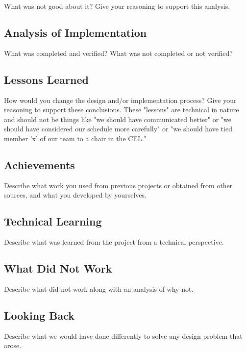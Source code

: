 What was not good about it? Give your reasoning to support this analysis.


\subsection{Analysis of Implementation}
What was completed and verified? What was not completed or not verified?

\subsection{Lessons Learned}
How would you change the design and/or implementation process? Give your reasoning to support these conclusions. These "lessons" are technical in nature and should not be things like "we should have communicated better" or "we should have considered our schedule more carefully" or "we should have tied member 'x' of our team to a chair in the CEL."

\subsection{Achievements}
Describe what work you used from previous projects or obtained from other sources, and what you developed by yourselves.

\subsection{Technical Learning}
Describe what was learned from the project from a technical perspective.

\subsection{What Did Not Work}
Describe what did not work along with an analysis of why not.

\subsection{Looking Back}
Describe what we would have done differently to solve any design problem that arose.

